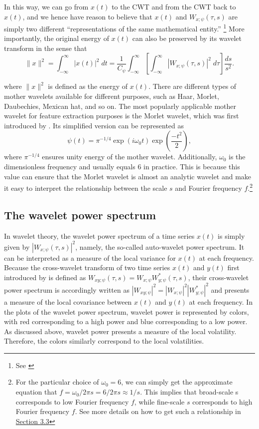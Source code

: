 \documentclass[a4paper,fleqn]{cas-sc}
\begin{document}
In this way, we can go from $x(t)$ to the CWT and from the CWT back to $x(t)$, and we hence have reason to believe that $x(t)$ and $W_{x;\psi}(\tau, s)$ are simply two different “representations of the same mathematical entity.” \footnote{See \citealt[p 2]{AGUIARCONRARIA2008}}  More importantly, the original energy of $x(t)$ can also be preserved by its wavelet transform in the sense that
\begin{equation}
    \|x\|^2 = \int_{-\infty}^\infty |x(t)|^2 \; dt = \dfrac{1}{C_\psi}\int_{-\infty}^\infty\left[\int_{-\infty}^\infty |W_{x;\psi}(\tau, s)|^2 \; d\tau \right] \dfrac{ds}{s^2}.
\end{equation}

where $\|x\|^2$ is defined as the energy of $x(t)$.
There are different types of mother wavelets available for different purposes, such as Haar, Morlet, Daubechies, Mexican hat, and so on. The most popularly applicable mother wavelet for feature extraction purposes is the Morlet wavelet, which was first introduced by \cite*{GOUPILLAUD1984}. Its simplified version can be represented as
\begin{equation}
    \psi(t)=\pi^{-1/4}\exp\left(i\omega_0t\right)\exp\left(\frac{-t^2}{2}\right),
\end{equation}
where $\pi^{-1/4}$ ensures unity energy of the mother wavelet. Additionally, $\omega_0$ is the dimensionless frequency and usually equals $6$ in practice. This is because this value can ensure that the Morlet wavelet is almost an analytic wavelet and make it easy to interpret the relationship between the scale $s$ and Fourier frequency $f$.\footnote{For the particular choice of $\omega_0 = 6$, we can simply get the approximate equation that $f = \omega_0/2\pi s = 6/2\pi s \approx 1/s$. This implies that broad-scale s corresponds to low Fourier frequency $f$, while fine-scale $s$ corresponds to high Fourier frequency $f$. See more details on how to get such a relationship in \hyperref[sec:3.3]{Section 3.3}}

\subsection{The wavelet power spectrum}
In wavelet theory, the wavelet power spectrum of a time series $x(t)$ is simply given by $|W_{x;\psi}(\tau, s)|^2$, namely, the so-called auto-wavelet power spectrum. It can be interpreted as a measure of the local variance for $x(t)$ at each frequency. Because the cross-wavelet transform of two time series $x(t)$ and $y(t)$ first introduced by \citet*{PhysRevLett.71.3279} is defined as $W_{xy;\psi}(\tau,s)=W_{x;\psi}W_{y;\psi}^* (\tau,s)$, their cross-wavelet power spectrum is accordingly written as  $|W_{xy;\psi}|^2=|W_{x;\psi}|^2 |W^*_{y;\psi}|^2$ and presents a measure of the local covariance between $x(t)$ and $y(t)$ at each frequency. In the plots of the wavelet power spectrum, wavelet power is represented by colors, with red corresponding to a high power and blue corresponding to a low power. As discussed above, wavelet power presents a measure of the local volatility. Therefore, the colors similarly correspond to the local volatilities.
\end{document}
